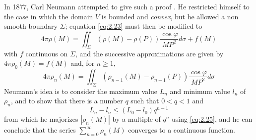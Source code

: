 \documentclass[12pt,a4paper,leqno,twoside]{extbook}
\begin{document}
In 1877, Carl Neumann attempted to give such a proof \cite{165}. He restricted himself to the case in which the domain \(V\) is bounded and \emph{convex}, but he allowed a non smooth boundary \(\Sigma\); equation \eqref{eq:2.23} must then be modified to
\begin{equation}
    \label{eq:2.24}
    4\pi \rho(M) = \iint_\Sigma \left( \rho(M) - \rho(P) \right) \frac{\cos \varphi}{MP^2} d\sigma + f(M)
\end{equation}
with \(f\) continuous on \(\Sigma\), and the successive approximations are given by \(4\pi\rho_0(M) = f(M)\) and, for \(n \geq 1\),
\begin{equation}
    \label{eq:2.25}
    4\pi \rho_n(M) = \iint_\Sigma \left( \rho_{n-1}(M) - \rho_{n-1}(P) \right) \frac{\cos \varphi}{MP^2} d\sigma
\end{equation}
Neumann's idea is to consider the maximum value \(L_n\) and minimum value \(l_n\) of \(\rho_n\), and to show that there is a number \(q\) such that \(0 < q < 1\) and
\begin{equation}
    \label{eq:2.26}
    L_n - l_n \leq \left( L_0 - l_0 \right) q^{n - 1}
\end{equation}
from which he majorizes \(|\rho_n(M)|\) by a multiple of \(q^n\) using \eqref{eq:2.25}, and he can conclude that the series \(\sum\limits_{n=0}^\infty \rho_n(M)\) converges to a continuous function.
\end{document}
